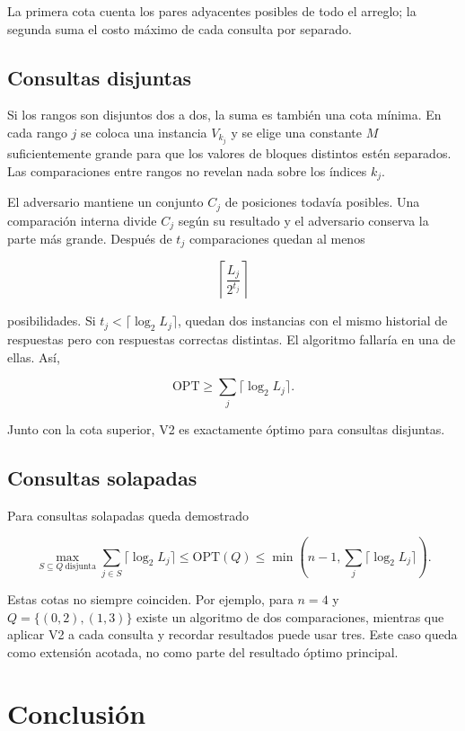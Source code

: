 \documentclass[11pt]{article}
\begin{document}
La primera cota cuenta los pares adyacentes posibles de todo el arreglo; la segunda suma el costo máximo
de cada consulta por separado.

\subsection*{Consultas disjuntas}

Si los rangos son disjuntos dos a dos, la suma es también una cota mínima. En cada rango $j$ se coloca
una instancia $V_{k_j}$ y se elige una constante $M$ suficientemente grande para que los valores de
bloques distintos estén separados. Las comparaciones entre rangos no revelan nada sobre los índices
$k_j$.

El adversario mantiene un conjunto $C_j$ de posiciones todavía posibles. Una comparación interna divide
$C_j$ según su resultado y el adversario conserva la parte más grande. Después de $t_j$ comparaciones
quedan al menos

\[
\left\lceil\frac{L_j}{2^{t_j}}\right\rceil
\]

posibilidades. Si $t_j<\lceil\log_2L_j\rceil$, quedan dos instancias con el mismo historial de respuestas
pero con respuestas correctas distintas. El algoritmo fallaría en una de ellas. Así,

\[
\mathrm{OPT}\ge\sum_j\lceil\log_2L_j\rceil.
\]

Junto con la cota superior, V2 es exactamente óptimo para consultas disjuntas.

\subsection*{Consultas solapadas}

Para consultas solapadas queda demostrado

\[
\max_{S\subseteq Q\ \text{disjunta}}
\sum_{j\in S}\lceil\log_2L_j\rceil
\le \mathrm{OPT}(Q)\le
\min\left(n-1,\sum_j\lceil\log_2L_j\rceil\right).
\]

Estas cotas no siempre coinciden. Por ejemplo, para $n=4$ y $Q=\{(0,2),(1,3)\}$ existe un algoritmo de
dos comparaciones, mientras que aplicar V2 a cada consulta y recordar resultados puede usar tres. Este
caso queda como extensión acotada, no como parte del resultado óptimo principal.

\section*{Conclusión}
\end{document}

